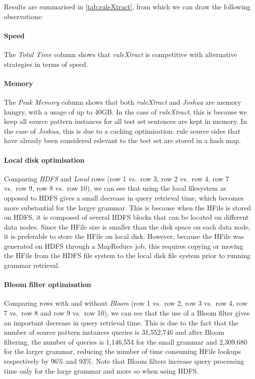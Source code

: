 Results are summarised in \autoref{tab:ruleXtract}, from which we can draw the
following observations:
%
\paragraph{Speed} The \emph{Total Time} column shows that \emph{ruleXtract} is
    competitive with alternative strategies in terms of speed.
\paragraph{Memory} The \emph{Peak Memory} column shows that both \emph{ruleXtract} and
    \emph{Joshua} are memory hungry, with a usage of up to 40GB. In the case of \emph{ruleXtract},
    this is because we keep all source pattern instances for all test set
    sentences are kept in memory. In the case
    of \emph{Joshua}, this is due to a caching optimisation: rule source sides
    that have already been considered relevant to the test set are stored
    in a hash map.
\paragraph{Local disk optimisation} Comparing \emph{HDFS} and \emph{Local} rows
    (row 1 vs.\ row 3, row 2 vs.\ row 4, row 7 vs.\ row 9, row 8 vs.\ row 10), we can
    see that using the local filesystem as opposed to HDFS gives a small
    decrease in query retrieval time, which becomes more
    substantial for the larger grammar.
    This is because when the HFile is stored on HDFS, it is composed of several
    HDFS blocks that can be located on different data nodes.
    Since the HFile size is smaller than the disk space on each data node, it is preferable
    to store the HFile on local disk. However, because the HFile was generated on
    HDFS through a MapReduce job, this
    requires copying or moving the HFile from the HDFS file system to the
    local disk file system prior to running grammar retrieval.
\paragraph{Bloom filter optimisation} Comparing rows with and without \emph{Bloom}
    (row 1 vs.\ row 2, row 3 vs.\ row 4, row 7 vs.\ row 8 and row 9 vs.\ row 10), we can
    see that the
    use of a Bloom filter gives an important decrease in query retrieval time.
    This is due to the fact that the number of source pattern instances queries
    is 31,552,746 and after Bloom filtering, the number of queries is 1,146,554
    for the small grammar and 2,309,680 for the larger grammar, reducing the
    number of time consuming HFile lookups respectively by 96\% and 93\%. Note
    that Bloom filters increase query processing time only for the
    large grammar and more so when using HDFS.
